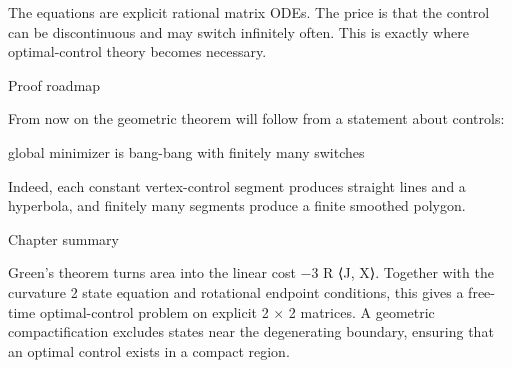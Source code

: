 The equations are explicit rational matrix ODEs. The price is that the control can be discontinuous and may switch infinitely often. This is exactly where optimal-control theory becomes necessary.


\begin{insightbox}{Proof roadmap}
\end{insightbox}

From now on the geometric theorem will follow from a statement about controls:


global minimizer is bang-bang with finitely many switches


Indeed, each constant vertex-control segment produces straight lines and a hyperbola, and finitely many segments produce a finite smoothed polygon.


\begin{insightbox}{Chapter summary}
\end{insightbox}

Green’s theorem turns area into the linear cost −3 R ⟨J, X⟩. Together with the curvature 2 state equation and rotational endpoint conditions, this gives a free-time optimal-control problem on explicit 2 × 2 matrices. A geometric compactification excludes states near the degenerating boundary, ensuring that an optimal control exists in a compact region.

